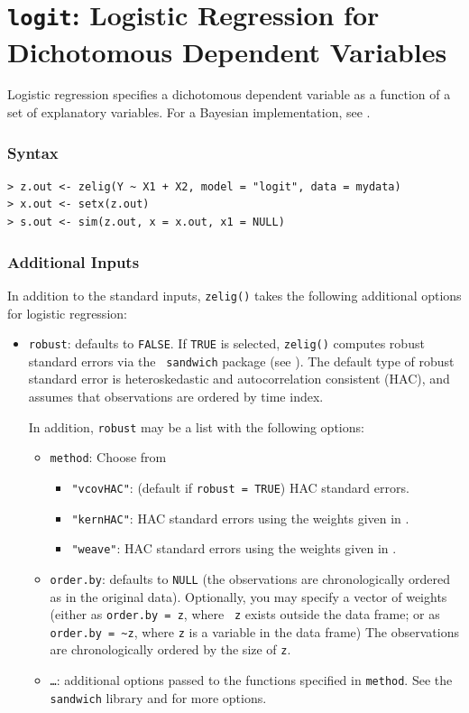 \documentclass{article}
\begin{document}
\nobibliography*


\section{{\tt logit}: Logistic Regression for Dichotomous Dependent
Variables}\label{logit}

Logistic regression specifies a dichotomous dependent variable as a
function of a set of explanatory variables.  For a Bayesian
implementation, see .  

\subsubsection{Syntax}

\begin{verbatim}
> z.out <- zelig(Y ~ X1 + X2, model = "logit", data = mydata)
> x.out <- setx(z.out)
> s.out <- sim(z.out, x = x.out, x1 = NULL)
\end{verbatim}

\subsubsection{Additional Inputs} 

In addition to the standard inputs, {\tt zelig()} takes the following
additional options for logistic regression:  
\begin{itemize}
\item {\tt robust}: defaults to {\tt FALSE}.  If {\tt TRUE} is
selected, {\tt zelig()} computes robust standard errors via the {\tt
sandwich} package (see \cite{Zeileis04}).  The default type of robust
standard error is heteroskedastic and autocorrelation consistent (HAC),
and assumes that observations are ordered by time index.

In addition, {\tt robust} may be a list with the following options:  
\begin{itemize}
\item {\tt method}:  Choose from 
\begin{itemize}
\item {\tt "vcovHAC"}: (default if {\tt robust = TRUE}) HAC standard
errors. 
\item {\tt "kernHAC"}: HAC standard errors using the
weights given in \cite{Andrews91}. 
\item {\tt "weave"}: HAC standard errors using the
weights given in \cite{LumHea99}.  
\end{itemize}  
\item {\tt order.by}: defaults to {\tt NULL} (the observations are
chronologically ordered as in the original data).  Optionally, you may
specify a vector of weights (either as {\tt order.by = z}, where {\tt
z} exists outside the data frame; or as {\tt order.by = \~{}z}, where
{\tt z} is a variable in the data frame)  The observations are
chronologically ordered by the size of {\tt z}.
\item {\tt \dots}:  additional options passed to the functions 
specified in {\tt method}.   See the {\tt sandwich} library and
\cite{Zeileis04} for more options.   
\end{itemize}
\end{itemize}
\end{document}

